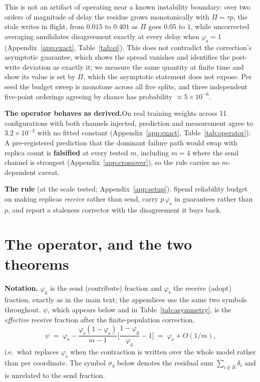 \documentclass{article}
\theoremstyle{plain}
\newcommand{\sg}{\sigma_g}
\newcommand{\pg}{\varphi_{\mathrm{g}}}
\newcommand{\ps}{\varphi_{\mathrm{s}}}
\begin{document}
This is not an artifact of operating near a known instability boundary: over two
orders of magnitude of delay the residue grows monotonically with $\Pi=\tau p$,
the stale writes in flight, from $0.015$ to $0.401$ as $\Pi$ goes $0.05$ to $1$,
while
uncorrected averaging annihilates disagreement exactly at every delay when
$\ps{=}1$ (Appendix~\ref{app:exact}, Table~\ref{tab:ei}). This does not
contradict the correction's asymptotic guarantee, which shows the spread
vanishes and identifies the post-write deviation as exactly it; we measure the
same quantity at finite time and show its value is set by $\Pi$, which the
asymptotic statement does not expose. Per seed the budget sweep is
monotone across all five splits, and three independent five-point orderings
agreeing by chance has probability ${\approx}5\times10^{-6}$.

\textbf{The operator behaves as derived.}\quad On real training weights across 11
configurations with both channels injected, prediction and measurement
agree to $3.2\times10^{-3}$ with no fitted constant (Appendix~\ref{app:exact},
Table~\ref{tab:operator}). A pre-registered prediction that the dominant failure
path would swap with replica count is \textbf{falsified} at every tested $m$,
including $m{=}4$ where the send channel is strongest
(Appendix~\ref{app:crossover}), so the rule carries no $m$-dependent caveat.

\textbf{The rule} (at the scale tested; Appendix~\ref{app:setup}).\quad
Spend reliability budget on making replicas \emph{receive} rather than send, carry $p\,\ps$ in guarantees rather than $p$,
and report a staleness corrector with the disagreement it buys back.




\appendix
\newpage

\section{The operator, and the two theorems}\label{app:theory}

\textbf{Notation.} $\pg$ is the send (contribute) fraction and $\ps$ the receive
(adopt) fraction, exactly as in the main text; the appendices use the same two
symbols throughout. $\psi$, which appears below and in
Table~\ref{tab:asymmetry}, is the \emph{effective} receive fraction after the
finite-population correction,
\[
\psi \;=\; \ps - \frac{\ps(1-\ps)}{m-1}\Big[\frac{1-\pg}{\pg}-1\Big] \;=\; \ps + O(1/m),
\]
i.e.\ what replaces $\ps$ when the contraction is written over the whole model
rather than per coordinate. The symbol $\sg$ below denotes the residual sum
$\sum_{i\notin R}\delta_i$ and is unrelated to the send fraction.
\end{document}
